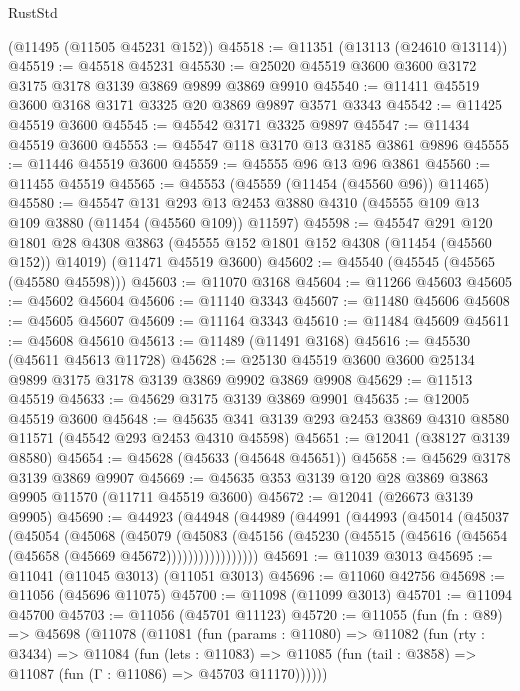\begin{lexlean}{RustStd}
\begin{coremodule}
    (@11495 (@11505 @45231 @152))
@45518 := @11351 (@13113 (@24610 @13114))
@45519 := @45518 @45231
@45530 := @25020 @45519 @3600 @3600 @3172 @3175 @3178 @3139 @3869 @9899 @3869 @9910
@45540 := @11411 @45519 @3600 @3168 @3171 @3325 @20 @3869 @9897 @3571 @3343
@45542 := @11425 @45519 @3600
@45545 := @45542 @3171 @3325 @9897
@45547 := @11434 @45519 @3600
@45553 := @45547 @118 @3170 @13 @3185 @3861 @9896
@45555 := @11446 @45519 @3600
@45559 := @45555 @96 @13 @96 @3861
@45560 := @11455 @45519
@45565 := @45553 (@45559 (@11454 (@45560 @96)) @11465)
@45580 := @45547
    @131
    @293
    @13
    @2453
    @3880
    @4310
    (@45555 @109 @13 @109 @3880 (@11454 (@45560 @109)) @11597)
@45598 := @45547
    @291
    @120
    @1801
    @28
    @4308
    @3863
    (@45555 @152 @1801 @152 @4308 (@11454 (@45560 @152)) @14019)
    (@11471 @45519 @3600)
@45602 := @45540 (@45545 (@45565 (@45580 @45598)))
@45603 := @11070 @3168
@45604 := @11266 @45603
@45605 := @45602 @45604
@45606 := @11140 @3343
@45607 := @11480 @45606
@45608 := @45605 @45607
@45609 := @11164 @3343
@45610 := @11484 @45609
@45611 := @45608 @45610
@45613 := @11489 (@11491 @3168)
@45616 := @45530 (@45611 @45613 @11728)
@45628 := @25130 @45519 @3600 @3600 @25134 @9899 @3175 @3178 @3139 @3869 @9902 @3869 @9908
@45629 := @11513 @45519
@45633 := @45629 @3175 @3139 @3869 @9901
@45635 := @12005 @45519 @3600
@45648 := @45635 @341 @3139 @293 @2453 @3869 @4310 @8580 @11571 (@45542 @293 @2453 @4310 @45598)
@45651 := @12041 (@38127 @3139 @8580)
@45654 := @45628 (@45633 (@45648 @45651))
@45658 := @45629 @3178 @3139 @3869 @9907
@45669 := @45635 @353 @3139 @120 @28 @3869 @3863 @9905 @11570 (@11711 @45519 @3600)
@45672 := @12041 (@26673 @3139 @9905)
@45690 := @44923
    (@44948
      (@44989
        (@44991
          (@44993
            (@45014
              (@45037
                (@45054
                  (@45068
                    (@45079
                      (@45083
                        (@45156
                          (@45230 (@45515 (@45616 (@45654 (@45658 (@45669 @45672)))))))))))))))))
@45691 := @11039 @3013
@45695 := @11041 (@11045 @3013) (@11051 @3013)
@45696 := @11060 @42756
@45698 := @11056 (@45696 @11075)
@45700 := @11098 (@11099 @3013)
@45701 := @11094 @45700
@45703 := @11056 (@45701 @11123)
@45720 := @11055
    (fun (fn : @89) =>
    @45698
      (@11078
        (@11081
          (fun (params : @11080) =>
          @11082
            (fun (rty : @3434) =>
            @11084
              (fun (lets : @11083) =>
              @11085 (fun (tail : @3858) => @11087 (fun (Γ : @11086) => @45703 @11170))))))

\end{coremodule}
\end{lexlean}
